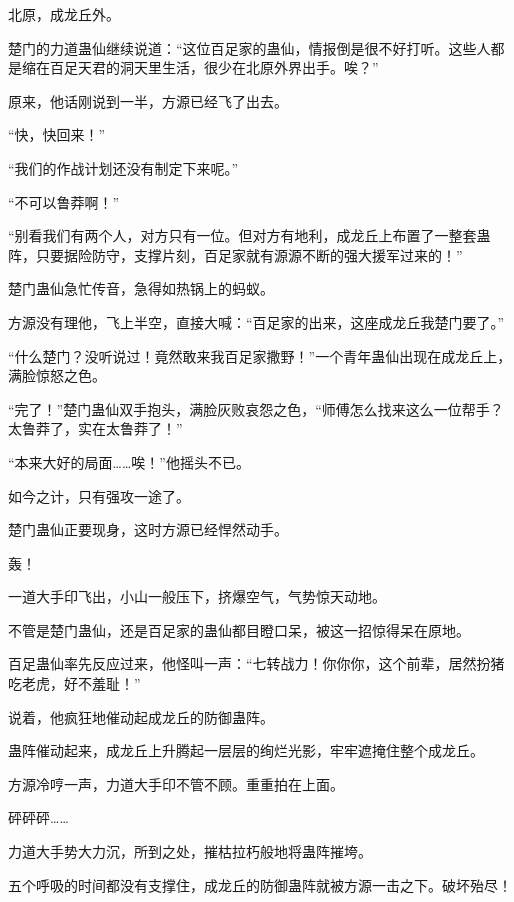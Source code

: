 
\begin{this_body}



北原，成龙丘外。

楚门的力道蛊仙继续说道：“这位百足家的蛊仙，情报倒是很不好打听。这些人都是缩在百足天君的洞天里生活，很少在北原外界出手。唉？”

原来，他话刚说到一半，方源已经飞了出去。

“快，快回来！”

“我们的作战计划还没有制定下来呢。”

“不可以鲁莽啊！”

“别看我们有两个人，对方只有一位。但对方有地利，成龙丘上布置了一整套蛊阵，只要据险防守，支撑片刻，百足家就有源源不断的强大援军过来的！”

楚门蛊仙急忙传音，急得如热锅上的蚂蚁。

方源没有理他，飞上半空，直接大喊：“百足家的出来，这座成龙丘我楚门要了。”

“什么楚门？没听说过！竟然敢来我百足家撒野！”一个青年蛊仙出现在成龙丘上，满脸惊怒之色。

“完了！”楚门蛊仙双手抱头，满脸灰败哀怨之色，“师傅怎么找来这么一位帮手？太鲁莽了，实在太鲁莽了！”

“本来大好的局面……唉！”他摇头不已。

如今之计，只有强攻一途了。

楚门蛊仙正要现身，这时方源已经悍然动手。

轰！

一道大手印飞出，小山一般压下，挤爆空气，气势惊天动地。

不管是楚门蛊仙，还是百足家的蛊仙都目瞪口呆，被这一招惊得呆在原地。

百足蛊仙率先反应过来，他怪叫一声：“七转战力！你你你，这个前辈，居然扮猪吃老虎，好不羞耻！”

说着，他疯狂地催动起成龙丘的防御蛊阵。

蛊阵催动起来，成龙丘上升腾起一层层的绚烂光影，牢牢遮掩住整个成龙丘。

方源冷哼一声，力道大手印不管不顾。重重拍在上面。

砰砰砰……

力道大手势大力沉，所到之处，摧枯拉朽般地将蛊阵摧垮。

五个呼吸的时间都没有支撑住，成龙丘的防御蛊阵就被方源一击之下。破坏殆尽！


\end{this_body}
